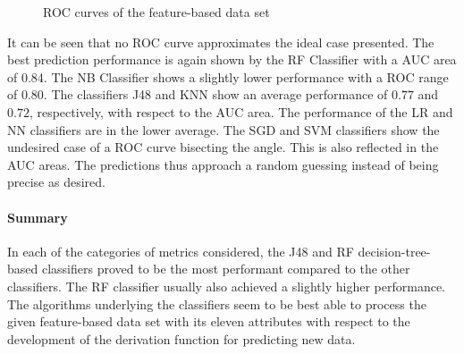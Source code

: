 \begin{figure}[t]
  \caption{ROC curves of the feature-based data set \label{fig:roc-feat}}
\end{figure}

It can be seen that no ROC curve approximates the ideal case presented. The best prediction performance is again shown by the RF Classifier with a AUC area of $0.84$. The NB Classifier shows a slightly lower performance with a ROC range of $0.80$. The classifiers J48 and KNN show an average performance of $0.77$ and $0.72$, respectively, with respect to the AUC area. The performance of the LR and NN classifiers are in the lower average. The SGD and SVM classifiers show the undesired case of a ROC curve bisecting the angle. This is also reflected in the AUC areas. The predictions thus approach a random guessing instead of being precise as desired.

\paragraph{Summary}

In each of the categories of metrics considered, the J48 and RF decision-tree-based classifiers proved to be the most performant compared to the other classifiers. The RF classifier usually also achieved a slightly higher performance. The algorithms underlying the classifiers seem to be best able to process the given feature-based data set with its eleven attributes with respect to the development of the derivation function for predicting new data.

